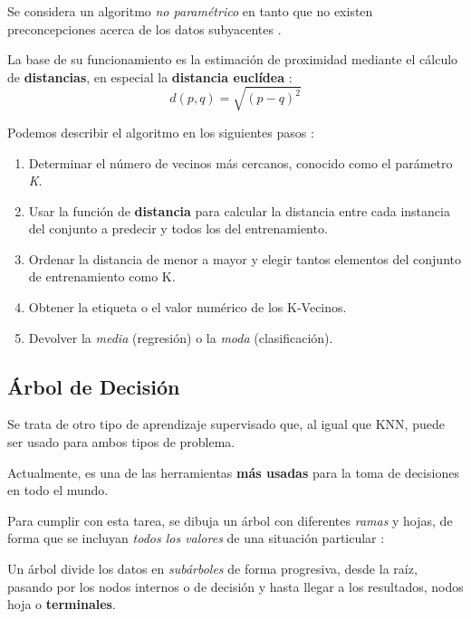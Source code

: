 Se considera un algoritmo \textit{no paramétrico} en tanto que no existen preconcepciones acerca de los datos subyacentes \cite{Belyadi2021SupervisedLearning}.

La base de su funcionamiento es la estimación de proximidad mediante el cálculo de \textbf{distancias}, en especial la \textbf{distancia euclídea} \cite{Greenacre2009CorrespondenceAnalysis}:
\begin{equation}
    d(p,q) = \sqrt{(p-q)^2}
\end{equation}

Podemos describir el algoritmo en los siguientes pasos \cite{Almomany2022OptimizedStudy}: 
\begin{enumerate}
    \item Determinar el número de vecinos más cercanos, conocido como el parámetro \textit{K}.
    \item Usar la función de \textbf{distancia} para calcular la distancia entre cada instancia del conjunto a predecir y todos los del entrenamiento.
    \item Ordenar la distancia de menor a mayor y elegir tantos elementos del conjunto de entrenamiento como K.
    \item Obtener la etiqueta o el valor numérico de los K-Vecinos.
    \item Devolver la \textit{media} (regresión) o la \textit{moda} (clasificación).
\end{enumerate}


\subsection{Árbol de Decisión}

Se trata de otro tipo de aprendizaje supervisado que, al igual que KNN, puede ser usado para ambos tipos de problema.

Actualmente, es una de las herramientas \textbf{más usadas} para la toma de decisiones \cite{Navada2011OverviewLearning} en todo el mundo.

Para cumplir con esta tarea, se dibuja un árbol con diferentes \textit{ramas} y hojas, de forma que se incluyan \textit{todos los valores} de una situación particular \cite{Navada2011OverviewLearning}:


Un árbol divide los datos en \textit{subárboles} de forma progresiva, desde la raíz, pasando por los nodos internos o de decisión y hasta llegar a los resultados, nodos hoja o \textbf{terminales}.

